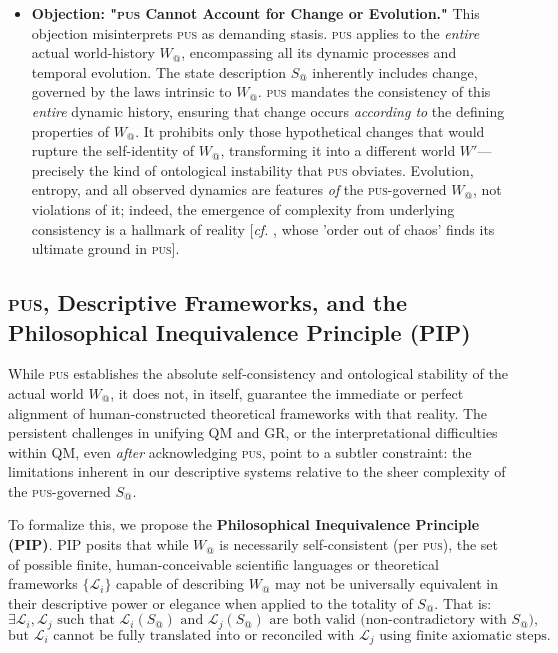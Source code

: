 \documentclass[11pt, a4paper]{article}
\makeatletter
\newcommand{\pus}{\textsc{pus}} %
\newcommand{\Wactual}{W_{@}} %
\newcommand{\Sactual}{S_{@}} %
\newcommand{\LangSet}{\{\mathcal{L}_i\}} %
\makeatother
\begin{document}
\begin{itemize}
    \item \textbf{Objection: "\pus{} Cannot Account for Change or Evolution."} This objection misinterprets \pus{} as demanding stasis. \pus{} applies to the \textit{entire} actual world-history $\Wactual$, encompassing all its dynamic processes and temporal evolution. The state description $\Sactual$ inherently includes change, governed by the laws intrinsic to $\Wactual$. \pus{} mandates the consistency of this \textit{entire} dynamic history, ensuring that change occurs \textit{according to} the defining properties of $\Wactual$. It prohibits only those hypothetical changes that would rupture the self-identity of $\Wactual$, transforming it into a different world $W'$—precisely the kind of ontological instability that \pus{} obviates. Evolution, entropy, and all observed dynamics are features \textit{of} the \pus-governed $\Wactual$, not violations of it; indeed, the emergence of complexity from underlying consistency is a hallmark of reality [\textit{cf.} \citealp{prigogine1984}, whose 'order out of chaos' finds its ultimate ground in \pus{}].
\end{itemize}

\subsection{\pus, Descriptive Frameworks, and the Philosophical Inequivalence Principle (PIP)}
While \pus{} establishes the absolute self-consistency and ontological stability of the actual world $\Wactual$, it does not, in itself, guarantee the immediate or perfect alignment of human-constructed theoretical frameworks with that reality. The persistent challenges in unifying QM and GR, or the interpretational difficulties within QM, even \textit{after} acknowledging \pus, point to a subtler constraint: the limitations inherent in our descriptive systems relative to the sheer complexity of the \pus-governed $\Sactual$.

To formalize this, we propose the \textbf{Philosophical Inequivalence Principle (PIP)}. PIP posits that while $\Wactual$ is necessarily self-consistent (per \pus), the set of possible finite, human-conceivable scientific languages or theoretical frameworks $\LangSet$ capable of describing $\Wactual$ may not be universally equivalent in their descriptive power or elegance when applied to the totality of $\Sactual$. That is:
\[
\exists \mathcal{L}_i, \mathcal{L}_j \text{ such that } \mathcal{L}_i(\Sactual) \text{ and } \mathcal{L}_j(\Sactual) \text{ are both valid (non-contradictory with } \Sactual),
\]
\[
\text{but } \mathcal{L}_i \text{ cannot be fully translated into or reconciled with } \mathcal{L}_j \text{ using finite axiomatic steps.}
\]
\end{document}
